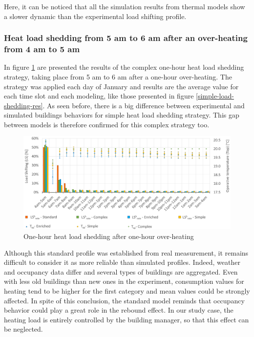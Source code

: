 \documentclass[buildings,article,submit,moreauthors,pdftex,10pt,a4paper]{mdpi}
\theoremstyle{mdpi}
\newcounter{ex}
\newcounter{re}
\theoremstyle{mdpidefinition}
\begin{document}
Here, it can be noticed that all the simulation results from thermal models show a slower dynamic than the experimental load shifting profile.

\subsubsection{Heat load shedding from 5 am to 6 am after an over-heating from 4 am to 5 am}
In figure \ref{complex-load-shedding-res} are presented the results of the complex one-hour heat load shedding strategy, taking place from 5 am to 6 am after a one-hour over-heating. The strategy was applied each day of January and results are the average value for each time slot and each modeling, like those presented in figure \ref{simple-load-shedding-res}. As seen before, there is a big difference between experimental and simulated buildings behaviors for simple heat load shedding strategy. This gap between models is therefore confirmed for this complex strategy too.

\begin{figure}[H]
	\centering
	\includegraphics[width=15cm]{pre_heating_ls.png}
	\caption{One-hour heat load shedding after one-hour over-heating}
    \label{complex-load-shedding-res}
\end{figure}

Although this standard profile was established from real measurement, it remains difficult to consider it as more reliable than simulated profiles. Indeed, weather and occupancy data differ and several types of buildings are aggregated. Even with less old buildings than new ones in the experiment, consumption values for heating tend to be higher for the first category and mean values could be strongly affected. In spite of this conclusion, the standard model reminds that occupancy behavior could play a great role in the rebound effect. In our study case, the heating load is entirely controlled by the building manager, so that this effect can be neglected.
\end{document}
